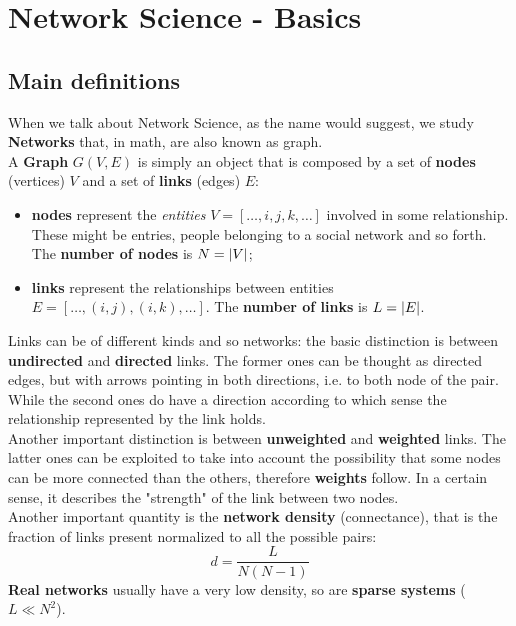 \documentclass[../main/main.tex]{subfiles}
\begin{document}
\chapter{Network Science - Basics}

\section{Main definitions}

When we talk about Network Science, as the name would suggest, we study \textbf{Networks} that, in math, are also known as graph.\\
A \textbf{Graph} $G(V,E)$ is simply an object that is composed by a set of \textbf{nodes} (vertices) \( V \) and a set of \textbf{links} (edges) \( E \):
\begin{itemize}
\item \textbf{nodes} represent the \emph{entities} \( V=[\dots,i,j,k,\dots] \) involved in some relationship. These might be entries, people belonging to a social network and so forth. The \textbf{number of nodes} is \( N= \abs{V}  \);

\item \textbf{links} represent the relationships between entities \( E=[\dots,(i,j),(i,k),\dots] \). The \textbf{number of links} is \( L= \abs{E}  \).
\end{itemize}

Links can be of different kinds and so networks: the basic distinction is between \textbf{undirected} and \textbf{directed} links. The former ones can be thought as directed edges, but with arrows pointing in both directions, i.e. to both node of the pair. While the second ones do have a direction according to which sense the relationship represented by the link holds.\\
Another important distinction is between \textbf{unweighted} and \textbf{weighted} links. The latter ones can be exploited to take into account the possibility that some nodes can be more connected than the others, therefore \textbf{weights} follow. In a certain sense, it describes the "strength" of the link between two nodes.\\

Another important quantity is the \textbf{network density} (connectance), that is the fraction of links present normalized to all the possible pairs:
\begin{equation}
  d = \frac{L}{N(N-1)}
\end{equation}
\textbf{Real networks} usually have a very low density, so are \textbf{sparse systems} (\( L \ll N^2 \)).\\
\end{document}
